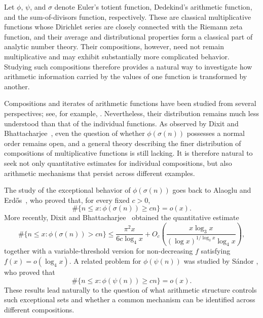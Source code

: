 \documentclass{article}
\theoremstyle{remark}
\begin{document}
Let \(\phi\), \(\psi\), and \(\sigma\) denote Euler's totient function,
Dedekind's arithmetic function, and the sum-of-divisors function,
respectively. These are classical multiplicative functions whose
Dirichlet series are closely connected with the Riemann zeta function,
and their average and distributional properties form a classical part
of analytic number theory. Their compositions, however, need not
remain multiplicative and may exhibit substantially more complicated
behavior. Studying such compositions therefore provides a natural way
to investigate how arithmetic information carried by the values of one
function is transformed by another.

Compositions and iterates of arithmetic functions have been studied
from several perspectives; see, for example,
\cite{luca,EGPS,József}. Nevertheless, their distribution remains much
less understood than that of the individual functions. As observed by
Dixit and Bhattacharjee~\cite{Bhattacharjee}, even the question of
whether \(\phi(\sigma(n))\) possesses a normal order remains open, and
a general theory describing the finer distribution of compositions of
multiplicative functions is still lacking. It is therefore natural to
seek not only quantitative estimates for individual compositions, but
also arithmetic mechanisms that persist across different examples.

The study of the exceptional behavior of \(\phi(\sigma(n))\) goes back
to Alaoglu and Erd\H{o}s~\cite{erdos}, who proved that, for every fixed
\(c>0\),
\[
\#\{n\le x:\phi(\sigma(n))\ge cn\}=o(x).
\]
More recently, Dixit and Bhattacharjee~\cite{Bhattacharjee} obtained
the quantitative estimate
\[
\#\{n\le x:\phi(\sigma(n))>cn\}
\le
\frac{\pi^2x}{6c\log_4x}
+
O_c\left(
\frac{x\log_3x}
{(\log x)^{1/\log_3x}\log_4x}
\right),
\]
together with a variable-threshold version for non-decreasing
\(f\) satisfying \(f(x)=o(\log_4x)\). A related problem for
\(\phi(\psi(n))\) was studied by S\'andor
\cite{SÁNDOR2,Sándor}, who proved that
\[
\#\{n\le x:\phi(\psi(n))\ge cn\}=o(x).
\]
These results lead naturally to the question of what arithmetic
structure controls such exceptional sets and whether a common
mechanism can be identified across different compositions.
\end{document}
